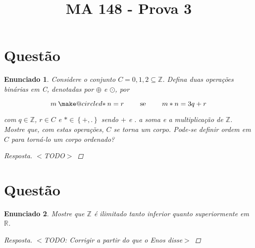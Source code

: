 \documentclass[a4paper,twoside,11pt]{article}
\makeatletter
\newcommand{\oast}{\mathbin{\mathpalette\make@circled\ast}}
\newcommand{\make@circled}[2]{%
  \ooalign{$\m@th#1\smallbigcirc{#1}$\cr\hidewidth$\m@th#1#2$\hidewidth\cr}%
}
\newcommand{\smallbigcirc}[1]{%
  \vcenter{\hbox{\scalebox{0.77778}{$\m@th#1\bigcirc$}}}%
}
\newtheorem*{enunciado}{Enunciado}
\makeatother
\begin{document}
\title{MA 148 - Prova 3}
\author{}
\date{}
\maketitle



\section{Questão}
\begin{enunciado}
    Considere o conjunto $C = {0, 1, 2} \subseteq \mathbb{Z}$.
    Defina duas operações binárias em C, denotadas por $\oplus$ e $\odot$, por

    $$m \oast n = r \qquad \text{ se } \qquad m \ast n = 3q + r$$

    com $q \in \mathbb{Z}$, $r \in C$ e $\ast \in \left\{ +, . \right\}$ sendo
    $+$ e $.$ a soma e a multiplicação de $\mathbb{Z}$. Mostre que, com estas
    operações, $C$ se torna um corpo. Pode-se definir ordem em $C$ para
    torná-lo um corpo ordenado?

    \begin{proof}[Resposta]
        $<$TODO$>$
    \end{proof}
\end{enunciado}



\section{Questão}
\begin{enunciado}
    Mostre que $\mathbb{Z}$ é ilimitado tanto inferior quanto superiormente em
    $\mathbb{R}$.

    \begin{proof}[Resposta]
        $<$TODO: Corrigir a partir do que o Enos disse$>$
    \end{proof}
\end{enunciado}
\end{document}
